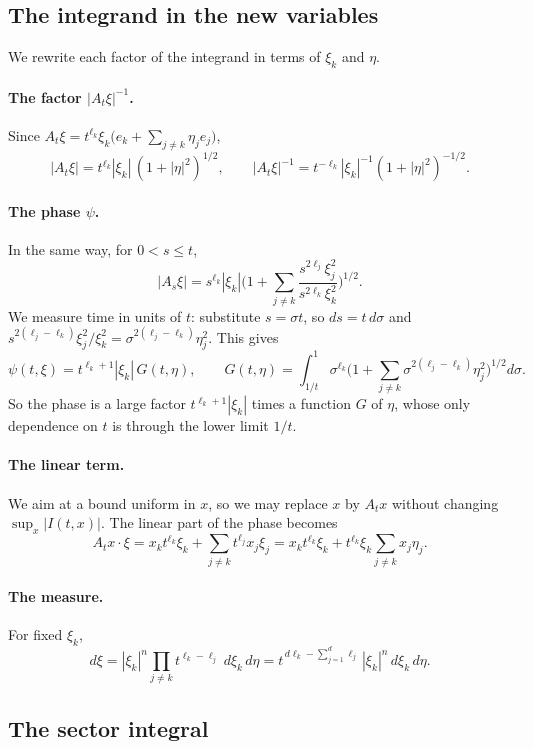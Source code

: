 \documentclass[11pt]{article}
\theoremstyle{remark}
\begin{document}
\subsection{The integrand in the new variables}

We rewrite each factor of the integrand in terms of $\xi_k$ and $\eta$.

\paragraph{The factor $|A_t\xi|^{-1}$.} Since
$A_t\xi=t^{\ell_k}\xi_k\big(e_k+\sum_{j\ne k}\eta_je_j\big)$,
\[
|A_t\xi|=t^{\ell_k}|\xi_k|\,(1+|\eta|^2)^{1/2},
\qquad
|A_t\xi|^{-1}=t^{-\ell_k}|\xi_k|^{-1}(1+|\eta|^2)^{-1/2}.
\]

\paragraph{The phase $\psi$.} In the same way, for $0<s\le t$,
\[
|A_s\xi|=s^{\ell_k}|\xi_k|\Big(1+\sum_{j\ne k}\frac{s^{2\ell_j}\xi_j^2}{s^{2\ell_k}\xi_k^2}\Big)^{1/2}.
\]
We measure time in units of $t$: substitute $s=\sigma t$, so $ds=t\,d\sigma$ and
$s^{2(\ell_j-\ell_k)}\xi_j^2/\xi_k^2=\sigma^{2(\ell_j-\ell_k)}\eta_j^2$. This gives
\[
\psi(t,\xi)=t^{\ell_k+1}|\xi_k|\,G(t,\eta),
\qquad
G(t,\eta)=\int_{1/t}^1\sigma^{\ell_k}\Big(1+\sum_{j\ne k}\sigma^{2(\ell_j-\ell_k)}\eta_j^2\Big)^{1/2}d\sigma .
\]
So the phase is a large factor $t^{\ell_k+1}|\xi_k|$ times a function $G$ of
$\eta$, whose only dependence on $t$ is through the lower limit $1/t$.

\paragraph{The linear term.} We aim at a bound uniform in $x$, so we may replace $x$
by $A_tx$ without changing $\sup_x|I(t,x)|$. The linear part of the phase becomes
\[
A_tx\cdot\xi=x_kt^{\ell_k}\xi_k+\sum_{j\ne k}t^{\ell_j}x_j\xi_j
=x_kt^{\ell_k}\xi_k+t^{\ell_k}\xi_k\sum_{j\ne k}x_j\eta_j .
\]

\paragraph{The measure.} For fixed $\xi_k$,
\[
d\xi=|\xi_k|^{n}\prod_{j\ne k}t^{\ell_k-\ell_j}\;d\xi_k\,d\eta
=t^{\,d\ell_k-\sum_{j=1}^d\ell_j}\,|\xi_k|^{n}\,d\xi_k\,d\eta .
\]

\subsection{The sector integral}\label{sec:sector-integral}
\end{document}
